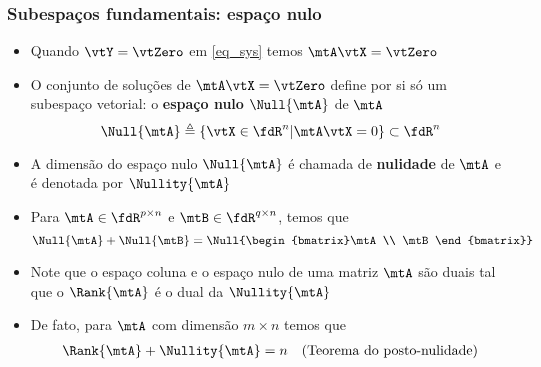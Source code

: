 \begin{frame}
  \frametitle{Subespaços fundamentais: espaço nulo}
  \begin{itemize}
    \item Quando $\vtY = \vtZero$ em \eqref{eq_sys} temos $\mtA\vtX = \vtZero$
    \item O conjunto de soluções de $\mtA\vtX = \vtZero$ define por si só um subespaço vetorial: o \textbf{\alert{espaço nulo}} $\Null{\mtA}$ de $\mtA$
    \begin{equation}\label{eq_null_space}
      \Null{\mtA} \triangleq \left\{\vtX \in \fdR^n \vert \mtA\vtX = 0\right\} \subset \fdR^n
    \end{equation}
    \item A dimensão do espaço nulo $\Null{\mtA}$ é chamada de \textbf{\alert{nulidade}} de $\mtA$ e é denotada por $\Nullity{\mtA}$
    \item Para $ \mtA \in \fdR^{p \times n} $ e $ \mtB \in \fdR^{q \times n} $, temos que
    \begin{equation}
      \Null{\mtA} + \Null{\mtB} = \Null{\begin{bmatrix}\mtA \\ \mtB\end{bmatrix}}
    \end{equation}
    \item Note que o espaço coluna e o espaço nulo de uma matriz $\mtA$ são duais tal que o $\Rank{\mtA}$ é o dual da $\Nullity{\mtA}$
    \item De fato, para $\mtA$ com dimensão $m \times n$ temos que
    \begin{align}
      \Rank{\mtA} + \Nullity{\mtA} &= n & \text{(Teorema do posto-nulidade)}
    \end{align}
  \end{itemize}
\end{frame}

